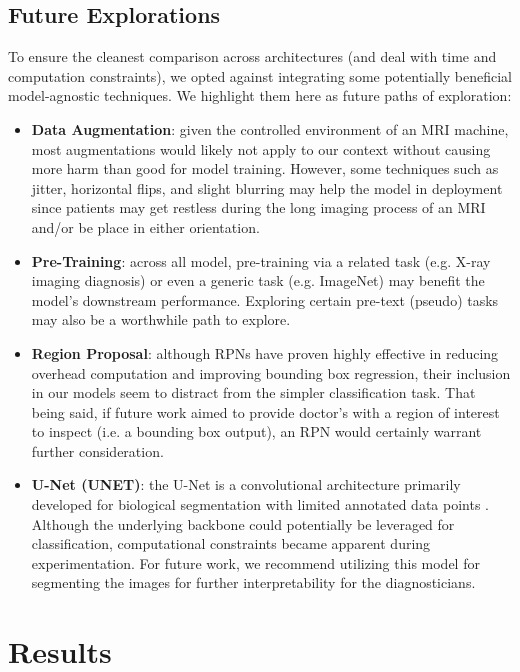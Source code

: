\documentclass[conference]{IEEEtran}
\begin{document}
\subsection{Future Explorations}
To ensure the cleanest comparison across architectures (and deal with time and computation constraints), we opted against integrating some potentially beneficial model-agnostic techniques. We highlight them here as future paths of exploration:
\begin{itemize}
    \item \textbf{Data Augmentation}: given the controlled environment of an MRI machine, most augmentations would likely not apply to our context without causing more harm than good for model training. However, some techniques such as jitter, horizontal flips, and slight blurring may help the model in deployment since patients may get restless during the long imaging process of an MRI and/or be place in either orientation.

    \item \textbf{Pre-Training}: across all model, pre-training via a related task (e.g. X-ray imaging diagnosis) or even a generic task (e.g. ImageNet) may benefit the model's downstream performance. Exploring certain pre-text (pseudo) tasks may also be a worthwhile path to explore.

    \item \textbf{Region Proposal}: although RPNs have proven highly effective in reducing overhead computation and improving bounding box regression, their inclusion in our models seem to distract from the simpler classification task. That being said, if future work aimed to provide doctor's with a region of interest to inspect (i.e. a bounding box output), an RPN would certainly warrant further consideration.

    \item \textbf{U-Net (UNET)}: the U-Net is a convolutional architecture primarily developed for biological segmentation with limited annotated data points \cite{unet}. Although the underlying backbone could potentially be leveraged for classification, computational constraints became apparent during experimentation. For future work, we recommend utilizing this model for segmenting the images for further interpretability for the diagnosticians.
\end{itemize}


\section{Results}
\end{document}
